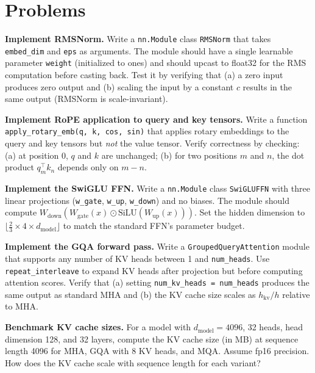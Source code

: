 \section*{Problems}

\begin{problem}[1]
  \textbf{Implement RMSNorm.} Write a \texttt{nn.Module} class
  \texttt{RMSNorm} that takes \texttt{embed\_dim} and \texttt{eps} as
  arguments. The module should have a single learnable parameter
  \texttt{weight} (initialized to ones) and should upcast to float32 for
  the RMS computation before casting back. Test it by verifying that
  (a) a zero input produces zero output and (b) scaling the input by a
  constant $c$ results in the same output (RMSNorm is scale-invariant).
\end{problem}

\begin{problem}[2]
  \textbf{Implement RoPE application to query and key tensors.} Write a
  function \texttt{apply\_rotary\_emb(q, k, cos, sin)} that applies rotary
  embeddings to the query and key tensors but \emph{not} the value tensor.
  Verify correctness by checking: (a) at position 0, $q$ and $k$ are
  unchanged; (b) for two positions $m$ and $n$, the dot product
  $q_m^\top k_n$ depends only on $m - n$.
\end{problem}

\begin{problem}[3]
  \textbf{Implement the SwiGLU FFN.} Write a \texttt{nn.Module} class
  \texttt{SwiGLUFFN} with three linear projections
  (\texttt{w\_gate}, \texttt{w\_up}, \texttt{w\_down}) and no biases.
  The module should compute
  $W_{\text{down}}(W_{\text{gate}}(x) \odot \text{SiLU}(W_{\text{up}}(x)))$.
  Set the hidden dimension to
  $\lfloor\frac{2}{3} \times 4 \times d_{\text{model}}\rfloor$ to match
  the standard FFN's parameter budget.
\end{problem}

\begin{problem}[4]
  \textbf{Implement the GQA forward pass.} Write a
  \texttt{GroupedQueryAttention} module that supports any number of KV
  heads between 1 and \texttt{num\_heads}. Use
  \texttt{repeat\_interleave} to expand KV heads after projection but
  before computing attention scores. Verify that
  (a) setting \texttt{num\_kv\_heads = num\_heads} produces the same
  output as standard MHA and (b) the KV cache size scales as
  $h_{\text{kv}} / h$ relative to MHA.
\end{problem}

\begin{problem}[5]
  \textbf{Benchmark KV cache sizes.} For a model with
  $d_{\text{model}} = 4096$, 32 heads, head dimension 128, and 32
  layers, compute the KV cache size (in MB) at sequence length 4096 for
  MHA, GQA with 8 KV heads, and MQA. Assume fp16 precision. How does
  the KV cache scale with sequence length for each variant?
\end{problem}